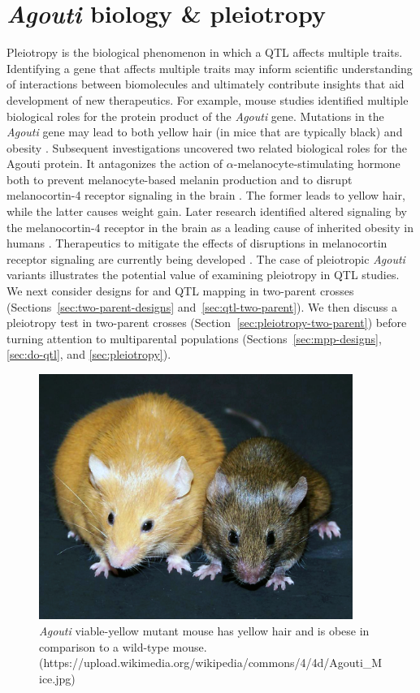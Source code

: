 \documentclass[oneside]{book}\usepackage[]{graphicx}\usepackage[]{color}
\begin{document}
\section{\emph{Agouti} biology \& pleiotropy}
Pleiotropy is the biological phenomenon in which a QTL affects multiple traits. 
Identifying a gene that affects multiple traits may inform scientific understanding of
interactions between biomolecules and ultimately contribute insights that aid development
of new therapeutics. 
For example, mouse studies identified multiple biological roles for the protein product of 
the \emph{Agouti} gene. Mutations in the \emph{Agouti} gene may lead to both 
yellow hair (in mice that are typically black) and obesity \citep{attie2017how}.
Subsequent investigations uncovered two related biological roles for the Agouti protein.
It antagonizes the action of $\alpha$-melanocyte-stimulating hormone both to
prevent melanocyte-based melanin production and to disrupt melanocortin-4
receptor signaling in the brain \citep{lu1994agouti,klebig1995ectopic,huszar1997targeted}.
The former leads to yellow hair, while the latter causes weight gain.
Later research identified altered signaling by the melanocortin-4 receptor in
the brain as a leading cause of inherited obesity in humans \citep{farooqi2003clinical,vaisse2000melanocortin}.
Therapeutics to mitigate the effects of disruptions in melanocortin receptor signaling are
currently being developed \citep{macneil2002role,fani2014melanocortin}.
The case of pleiotropic \emph{Agouti} variants illustrates the potential value of examining pleiotropy in QTL studies.
We next consider designs for and QTL mapping in two-parent crosses (Sections~\ref{sec:two-parent-designs} and~\ref{sec:qtl-two-parent}).
We then discuss a pleiotropy test in two-parent crosses (Section~\ref{sec:pleiotropy-two-parent}) before
turning attention to multiparental populations (Sections~\ref{sec:mpp-designs}, \ref{sec:do-qtl}, and \ref{sec:pleiotropy}).



\begin{figure}
\includegraphics[height=8cm]{figs/Agouti.jpg}
\caption{\emph{Agouti} viable-yellow mutant mouse has yellow hair and is obese in comparison to a wild-type mouse. (https://upload.wikimedia.org/wikipedia/commons/4/4d/Agouti\_Mice.jpg)}
\label{fig:agouti}
\end{figure}
\end{document}
